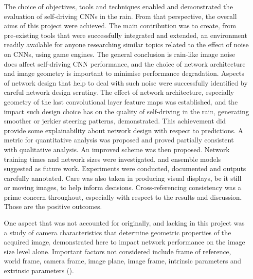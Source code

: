 The choice of objectives, tools and techniques enabled and demonstrated the evaluation of self-driving CNNs in the rain. From that perspective, the overall aims of this project were achieved. 
The main contribution was to create, from pre-existing tools that were successfully integrated and extended, an environment readily available for anyone researching similar topics related to the effect of noise on CNNs, using game engines. 
The general conclusion is rain-like image noise does affect self-driving CNN performance, and the choice of network architecture and image geometry is important to minimise performance degradation. Aspects of network design that help to deal with such noise were successfully identified by careful network design scrutiny. The effect of network architecture, especially geometry of the last convolutional layer feature maps was established, and the impact such design choice has on the quality of self-driving in the rain, generating smoother or jerkier steering patterns, demonstrated. 
This achievement did provide some explainability about network design with respect to predictions.
A metric for quantitative analysis was proposed and proved partially consistent with qualitative analysis. An improved scheme was then proposed.
Network training times and network sizes were investigated, and ensemble models suggested as future work.
Experiments were conducted, documented and outputs carefully annotated. Care was also taken in producing visual displays, be it still or moving images, to help inform decisions. Cross-referencing consistency was a prime concern throughout, especially with respect to the results and discussion. Those are the positive outcomes. 


One aspect that was not accounted for originally, and lacking in this project was a study of camera characteristics that determine geometric properties of the acquired image, demonstrated here to impact network performance on the image size level alone. Important factors not considered include frame of reference, world frame, camera frame, image plane, image frame, intrinsic parameters and extrinsic parameters (\cite{Sala2006}).


